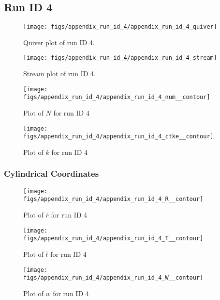 \subsection{Run ID 4}
\begin{figure}[H]
\centering
\texttt{[image: figs/appendix\_run\_id\_4/appendix\_run\_id\_4\_quiver]}
\caption{Quiver plot of run ID 4.}
\label{fig:appendix_run_id_4_quiver}
\end{figure}


\begin{figure}[H]
\centering
\texttt{[image: figs/appendix\_run\_id\_4/appendix\_run\_id\_4\_stream]}
\caption{Stream plot of run ID 4.}
\label{fig:appendix_run_id_4_stream}
\end{figure}


\begin{figure}[H]
\centering
\texttt{[image: figs/appendix\_run\_id\_4/appendix\_run\_id\_4\_num\_\_contour]}
\caption{Plot of $N$ for run ID 4}
\label{fig:appendix_run_id_4_num__contour}
\end{figure}


\begin{figure}[H]
\centering
\texttt{[image: figs/appendix\_run\_id\_4/appendix\_run\_id\_4\_ctke\_\_contour]}
\caption{Plot of $k$ for run ID 4}
\label{fig:appendix_run_id_4_ctke__contour}
\end{figure}


\subsubsection{Cylindrical Coordinates}
\begin{figure}[H]
\centering
\texttt{[image: figs/appendix\_run\_id\_4/appendix\_run\_id\_4\_R\_\_contour]}
\caption{Plot of $\overline{r}$ for run ID 4}
\label{fig:appendix_run_id_4_R__contour}
\end{figure}


\begin{figure}[H]
\centering
\texttt{[image: figs/appendix\_run\_id\_4/appendix\_run\_id\_4\_T\_\_contour]}
\caption{Plot of $\overline{t}$ for run ID 4}
\label{fig:appendix_run_id_4_T__contour}
\end{figure}


\begin{figure}[H]
\centering
\texttt{[image: figs/appendix\_run\_id\_4/appendix\_run\_id\_4\_W\_\_contour]}
\caption{Plot of $\overline{w}$ for run ID 4}
\label{fig:appendix_run_id_4_W__contour}
\end{figure}


